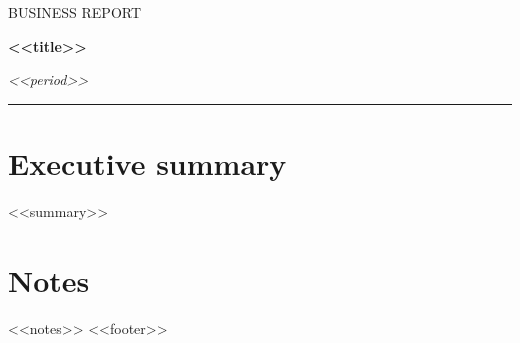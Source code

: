 \documentclass[11pt]{article}
\begin{document}
{\small BUSINESS REPORT}\par
{\LARGE\bfseries <<title>>}\par
\textit{<<period>>}
\bigskip
\hrule
\section*{Executive summary}
<<summary>>
\section*{Notes}
<<notes>>
<<footer>>
\end{document}
